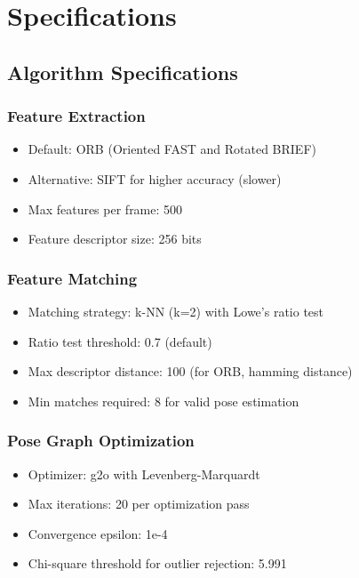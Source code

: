 %
%

\chapter{Specifications}

\section{Algorithm Specifications}

\subsection{Feature Extraction}
\begin{itemize}
    \item Default: ORB (Oriented FAST and Rotated BRIEF)
    \item Alternative: SIFT for higher accuracy (slower)
    \item Max features per frame: 500
    \item Feature descriptor size: 256 bits
\end{itemize}

\subsection{Feature Matching}
\begin{itemize}
    \item Matching strategy: k-NN (k=2) with Lowe's ratio test
    \item Ratio test threshold: 0.7 (default)
    \item Max descriptor distance: 100 (for ORB, hamming distance)
    \item Min matches required: 8 for valid pose estimation
\end{itemize}

\subsection{Pose Graph Optimization}
\begin{itemize}
    \item Optimizer: g2o with Levenberg-Marquardt
    \item Max iterations: 20 per optimization pass
    \item Convergence epsilon: 1e-4
    \item Chi-square threshold for outlier rejection: 5.991
\end{itemize}

